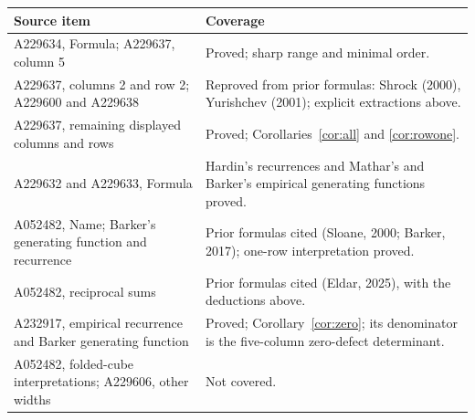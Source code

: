 \begin{center}\small
\begin{tabular}{>{\raggedright\arraybackslash}p{.43\linewidth}>{\raggedright\arraybackslash}p{.49\linewidth}}
\toprule
Source item&Coverage\\
\midrule
A229634, Formula; A229637, column 5&Proved; sharp range and minimal order.\\
A229637, columns 2 and row 2; A229600 and A229638&Reproved from prior
formulas: Shrock (2000), Yurishchev (2001); explicit extractions above.\\
A229637, remaining displayed columns and rows&Proved;
Corollaries~\ref{cor:all} and \ref{cor:rowone}.\\
A229632 and A229633, Formula&Hardin's recurrences and Mathar's and Barker's
empirical generating functions proved.\\
A052482, Name; Barker's generating function and recurrence&Prior formulas cited
(Sloane, 2000; Barker, 2017); one-row interpretation proved.\\
A052482, reciprocal sums&Prior formulas cited (Eldar, 2025), with the deductions above.\\
A232917, empirical recurrence and Barker generating function&Proved;
Corollary~\ref{cor:zero}; its denominator is the five-column zero-defect determinant.\\
A052482, folded-cube interpretations; A229606, other widths&Not covered.\\
\bottomrule
\end{tabular}
\end{center}

